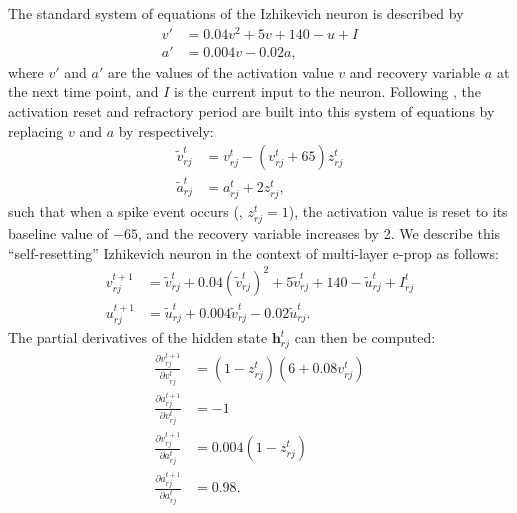 			The standard system of equations of the Izhikevich neuron is described by
			\begin{align}
			v' &= 0.04v^2 + 5v + 140 - u + I\\
			a' &= 0.004v - 0.02a,
			\end{align}
			where $v'$ and $a'$ are the values of the activation value $v$ and recovery variable $a$ at the next time point, and $I$ is the current input to the neuron.
			Following \citet{traub2020learning}, the activation reset and refractory period are built into this system of equations by replacing $v$ and $a$ by respectively:
			\begin{align}
			\tilde{v}^t_{rj} &= v^t_{rj} - \left(v^t_{rj} + 65\right)z^t_{rj}\\
			\tilde{a}^t_{rj} &= a^t_{rj} + 2z^t_{rj},
			\end{align}
			such that when a spike event occurs (\ie, $z^t_{rj} = 1$), the activation value is reset to its baseline value of $-65$, and the recovery variable increases by 2.
			We describe this ``self-resetting'' Izhikevich neuron in the context of multi-layer e-prop as follows:
			\begin{align}
			v^{t+1}_{rj} &= \tilde{v}^t_{rj} + 0.04\left(\tilde{v}^t_{rj}\right)^2 + 5\tilde{v}^t_{rj} + 140 - \tilde{u}^t_{rj} + I^t_{rj}\\
			u^{t+1}_{rj} &= \tilde{u}^t_{rj} + 0.004\tilde{v}^t_{rj}-0.02\tilde{u}^t_{rj}.
			\end{align}
			The partial derivatives of the hidden state $\mathbf{h}^t_{rj}$ can then be computed:
			\begin{align}
			\frac{\partial v^{t+1}_{rj}}{\partial v^t_{rj}} &= \left(1-z^t_{rj}\right)\left(6+0.08v^t_{rj}\right)\\
			\frac{\partial a^{t+1}_{rj}}{\partial v^t_{rj}} &= -1\\
			\frac{\partial v^{t+1}_{rj}}{\partial a^t_{rj}} &= 0.004\left(1-z^t_{rj}\right)\\
			\frac{\partial a^{t+1}_{rj}}{\partial a^t_{rj}} &= 0.98.
			\end{align}

